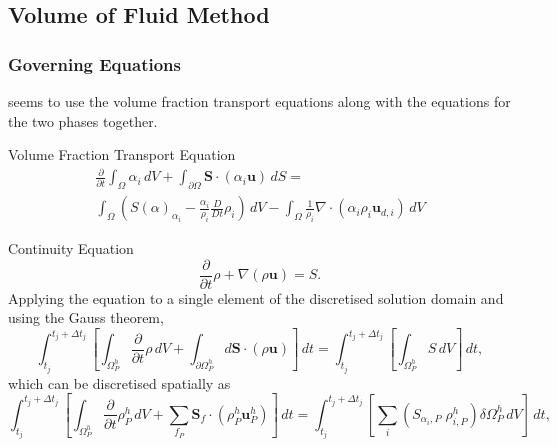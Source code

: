 \subsection{Volume of Fluid Method}
\subsubsection{Governing Equations}
seems to use the volume fraction transport equations along with the equations for the two phases together.

Volume Fraction Transport Equation
\begin{multline}\label{eqn_vofvolfractranspot}
    \frac{\partial}{\partial t} \int_{\Omega} \alpha_{i}\,dV + \int_{\partial \Omega} \mathbf{S} \cdot (\alpha_{i} \mathbf{u})\,dS =\\
    \int_{\Omega} \left(S(\alpha)_{\alpha_{i}} - \frac{\alpha_{i}}{\rho_{i}} \frac{D}{Dt} \rho_{i}\right)\,dV - \int_{\Omega} \frac{1}{\rho_{i}} \nabla \cdot (\alpha_{i} \rho_{i} \mathbf{u}_{d,i})\,dV
\end{multline}

Continuity Equation
\begin{equation}\label{eqn_vofcont}
    \frac{\partial}{\partial t} \rho + \nabla(\rho \mathbf{u}) = S.
\end{equation}
Applying the equation to a single element of the discretised solution domain and using the Gauss theorem,
\begin{equation}
    \int_{t_{j}}^{t_{j} + \Delta t_{j}} \left[
    \int_{\Omega_{P}^{h}}\frac{\partial}{\partial t} \rho\,dV + \int_{\partial\Omega_{P}^{h}}d\mathbf{S} \cdot (\rho \mathbf{u})\right]\,dt  = \int_{t_{j}}^{t_{j} + \Delta t_{j}} \left[\int_{\Omega_{P}^{h}}S\,dV\right]\,dt,
\end{equation}
which can be discretised spatially as
\begin{equation}
    \int_{t_{j}}^{t_{j} + \Delta t_{j}} \left[
    \int_{\Omega_{P}^{h}}\frac{\partial}{\partial t} \rho_{P}^{h}\,dV + \sum_{{f}_{P}}\mathbf{S}_{f} \cdot (\rho_{P}^{h} \mathbf{u}_{P}^{h})\right]\,dt  = \int_{t_{j}}^{t_{j} + \Delta t_{j}} \left[\sum_{i}(S_{\alpha_{i},P}\;\rho_{i,P}^{h})\delta\Omega_{P}^{h}\,dV\right]\,dt,
\end{equation}

